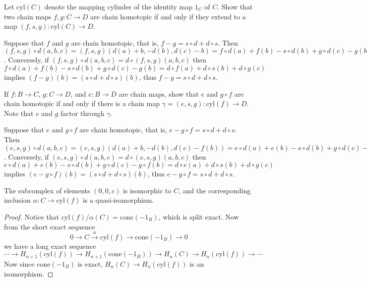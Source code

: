 \begin{exer} Let $\textrm{cyl}(C)$ denote the mapping cylinder of the identity map $1_C$ of $C$. Show that two chain maps $f,g:C\rightarrow D$ are chain homotopic if and only if they extend to a map $(f,s,g):\textrm{cyl}(C)\rightarrow D$.
\end{exer}
\begin{solution} Suppose that $f$ and $g$ are chain homotopic, that is, $f-g=s\circ d+d\circ s$. Then $(f,s,g)\circ d(a,b,c)=(f,s,g)(d(a)+b,-d(b),d(c)-b)=f\circ d(a)+f(b)-s\circ d(b)+g\circ d(c)-g(b)=d\circ f(a)+d\circ s(b)+d\circ g(c)=d\circ (f,s,g)(a,b,c)$. Conversely, if $(f,s,g)\circ d(a,b,c)=d\circ(f,s,g)(a,b,c)$ then $f\circ d(a)+f(b)-s\circ d(b)+g\circ d(c)-g(b)=d\circ f(a)+d\circ s(b)+d\circ g(c)$ implies $(f-g)(b)=(s\circ d+d\circ s)(b)$, thus $f-g=s\circ d+d\circ s$.
\end{solution}

\begin{exer} If $f:B\rightarrow C$, $g:C\rightarrow D$, and $e:B\rightarrow D$ are chain maps, show that $e$ and $g\circ f$ are chain homotopic if and only if there is a chain map $\gamma=(e,s,g):\textrm{cyl}(f)\rightarrow D$. Note that $e$ and $g$ factor through $\gamma$.
\end{exer}
\begin{solution} Suppose that $e$ and $g\circ f$ are chain homotopic, that is, $e-g\circ f=s\circ d+d\circ s$. Then $(e,s,g)\circ d(a,b,c)=(e,s,g)(d(a)+b,-d(b),d(c)-f(b))=e\circ d(a)+e(b)-s\circ d(b)+g\circ d(c)-g\circ f(b)=d\circ e(a)+d\circ s(b)+d\circ g(c)=d\circ (e,s,g)(a,b,c)$. Conversely, if $(e,s,g)\circ d(a,b,c)=d\circ (e,s,g)(a,b,c)$ then $e\circ d(a)+e(b)-s\circ d(b)+g\circ d(c)-g\circ f(b)=d\circ e(a)+d\circ s(b)+d\circ g(c)$ implies $(e-g\circ f)(b)=(s\circ d+d\circ s)(b)$, thus $e-g\circ f=s\circ d+d\circ s$.
\end{solution}

\begin{lemma} The subcomplex of elements $(0,0,c)$ is isomorphic to $C$, and the corresponding inclusion $\alpha:C\rightarrow \textrm{cyl}(f)$ is a quasi-isomorphism.
\end{lemma}
\begin{proof}
Notice that $\textrm{cyl}(f)/\alpha(C)=\textrm{cone}(-1_B)$, which is split exact. Now from the short exact sequence
\begin{equation}
0\rightarrow C\xrightarrow{\alpha} \textrm{cyl}(f)\rightarrow \textrm{cone}(-1_B)\rightarrow 0
\end{equation} 
we have a long exact sequence
\begin{equation}
\cdots\rightarrow H_{n+1}(\textrm{cyl}(f))\rightarrow H_{n+1}(\textrm{cone}(-1_B))\rightarrow H_n(C)\rightarrow H_n(\textrm{cyl}(f))\rightarrow\cdots
\end{equation}
Now since $\textrm{cone}(-1_B)$ is exact, $H_n(C)\rightarrow H_n(\textrm{cyl}(f))$ is an isomorphism.
\end{proof}

